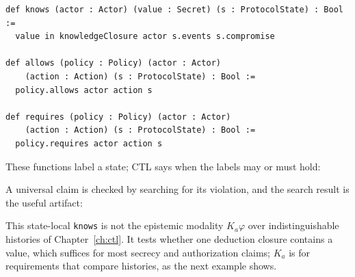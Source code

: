 \begin{lstlisting}
def knows (actor : Actor) (value : Secret) (s : ProtocolState) : Bool :=
  value in knowledgeClosure actor s.events s.compromise

def allows (policy : Policy) (actor : Actor)
    (action : Action) (s : ProtocolState) : Bool :=
  policy.allows actor action s

def requires (policy : Policy) (actor : Actor)
    (action : Action) (s : ProtocolState) : Bool :=
  policy.requires actor action s
\end{lstlisting}

These functions label a state; CTL says when the labels may or must hold:





A universal claim is checked by searching for its violation, and the search
result is the useful artifact:


This state-local \texttt{knows} is not the epistemic modality $K_a\varphi$ over
indistinguishable histories of Chapter~\ref{ch:ctl}. It tests whether one
deduction closure contains a value, which suffices for most secrecy and
authorization claims; $K_a$ is for requirements that compare histories, as the
next example shows.

